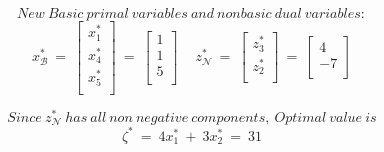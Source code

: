 \documentclass [12pt] {article}
\begin{document}
\[
New\ Basic\ primal\ variables\ and\ nonbasic\ dual\ variables:
\]
\[
x_{\mathcal B}^{*}\ =\
\begin{bmatrix}
x_{1}^{*} \\
x_{4}^{*} \\
x_{5}^{*} \\
\end{bmatrix}\ =\
\begin{bmatrix}
1 \\
1 \\
5 \\
\end{bmatrix}\
\quad
z_{\mathcal N}^{*}\ =\
\begin{bmatrix}
z_{3}^{*} \\
z_{2}^{*} \\
\end{bmatrix}\ =\
\begin{bmatrix}
4 \\
-7 \\
\end{bmatrix}
\]

\[
Since\ z_{\mathcal N}^{*}\ has\ all\ non\ negative\ components,\ Optimal\ value\ is
\]
\[
\zeta^{*}\ =\ 4x_{1}^{*}\ +\ 3x_{2}^{*}\ =\ 31
\]
\end{document}
